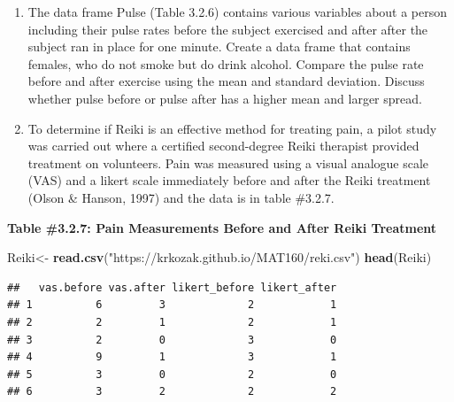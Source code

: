 \documentclass[
]{book}
\newenvironment{Shaded}{\begin{snugshade}}{\end{snugshade}}
\newcommand{\KeywordTok}[1]{\textcolor[rgb]{0.13,0.29,0.53}{\textbf{#1}}}
\newcommand{\NormalTok}[1]{#1}
\newcommand{\OperatorTok}[1]{\textcolor[rgb]{0.81,0.36,0.00}{\textbf{#1}}}
\newcommand{\StringTok}[1]{\textcolor[rgb]{0.31,0.60,0.02}{#1}}
\begin{document}
\begin{Shaded}
\end{Shaded}

\begin{enumerate}
\def\labelenumi{\arabic{enumi}.}
\setcounter{enumi}{5}
\item
  The data frame Pulse (Table 3.2.6) contains various variables about a person including their pulse rates before the subject exercised and after after the subject ran in place for one minute. Create a data frame that contains females, who do not smoke but do drink alcohol. Compare the pulse rate before and after exercise using the mean and standard deviation. Discuss whether pulse before or pulse after has a higher mean and larger spread.
\item
  To determine if Reiki is an effective method for treating pain, a pilot study was carried out where a certified second-degree Reiki therapist provided treatment on volunteers. Pain was measured using a visual analogue scale (VAS) and a likert scale immediately before and after the Reiki treatment (Olson \& Hanson, 1997) and the data is in table \#3.2.7.
\end{enumerate}

\textbf{Table \#3.2.7: Pain Measurements Before and After Reiki Treatment}

\begin{Shaded}
\begin{Highlighting}[]
\NormalTok{Reiki<-}\StringTok{ }\KeywordTok{read.csv}\NormalTok{(}\StringTok{"https://krkozak.github.io/MAT160/reki.csv"}\NormalTok{)}
\KeywordTok{head}\NormalTok{(Reiki)}
\end{Highlighting}
\end{Shaded}

\begin{verbatim}
##   vas.before vas.after likert_before likert_after
## 1          6         3             2            1
## 2          2         1             2            1
## 3          2         0             3            0
## 4          9         1             3            1
## 5          3         0             2            0
## 6          3         2             2            2
\end{verbatim}
\end{document}
